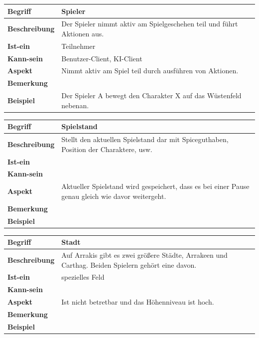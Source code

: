 \documentclass[12pt]{article}
\begin{document}
\begin{tabularx}{\linewidth}{|l|X|}
\hline
\textbf{Begriff} & \textbf{Spieler} \\
\hline
\textbf{Beschreibung} & Der Spieler nimmt aktiv am Spielgeschehen teil und führt Aktionen aus. \\
\hline
\textbf{Ist-ein} & Teilnehmer \\
\hline
\textbf{Kann-sein} & Benutzer-Client, KI-Client\\
\hline
\textbf{Aspekt} & Nimmt aktiv am Spiel teil durch ausführen von Aktionen.\\
\hline
\textbf{Bemerkung} &  \\
\hline
\textbf{Beispiel} & Der Spieler A bewegt den Charakter X auf das Wüstenfeld nebenan. \\
\hline
\end{tabularx}

\begin{tabularx}{\linewidth}{|l|X|}
\hline
\textbf{Begriff} & \textbf{Spielstand} \\
\hline
\textbf{Beschreibung} & Stellt den aktuellen Spielstand dar mit Spiceguthaben, Position der Charaktere, usw. \\
\hline
\textbf{Ist-ein} & \\
\hline
\textbf{Kann-sein} & \\
\hline
\textbf{Aspekt} & Aktueller Spielstand wird gespeichert, dass es bei einer Pause genau gleich wie davor weitergeht.\\
\hline
\textbf{Bemerkung} &  \\
\hline
\textbf{Beispiel} &  \\
\hline
\end{tabularx}

\begin{tabularx}{\linewidth}{|l|X|}
\hline
\textbf{Begriff} & \textbf{Stadt} \\
\hline
\textbf{Beschreibung} & Auf Arrakis gibt es zwei größere Städte, Arrakeen und Carthag. Beiden Spielern gehört eine davon. \\
\hline
\textbf{Ist-ein} & spezielles Feld \\
\hline
\textbf{Kann-sein} & \\
\hline
\textbf{Aspekt} & Ist nicht betretbar und das Höhenniveau ist hoch.\\
\hline
\textbf{Bemerkung} &  \\
\hline
\textbf{Beispiel} &  \\
\hline
\end{tabularx}
\end{document}
